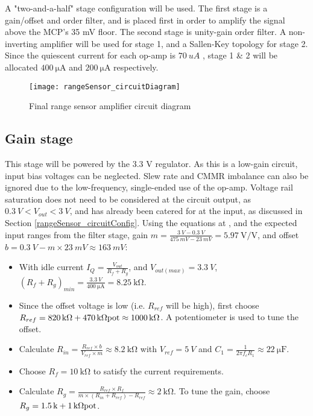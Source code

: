 A "two-and-a-half" stage configuration will be used. The first stage is a gain/offset and  order filter,
and is placed first in order to amplify the signal above the MCP's 35 mV floor. The second stage is unity-gain  order filter.
A non-inverting amplifier will be used for stage 1, and a Sallen-Key topology for stage 2. Since the quiescent current for each op-amp is
$\SI{70}{uA}$ \cite{datasheetMCP6242}, stage 1 \& 2 will be allocated $\SI{400}{\micro\ampere}$ and $\SI{200}{\micro\ampere}$ respectively.

\begin{figure}[!htb]
  \centering
  \texttt{[image: rangeSensor\_circuitDiagram]}
  \caption{Final range sensor amplifier circuit diagram}
  \label{fig:rangeSensor_circuitDiagram}
\end{figure}

\subsection{Gain stage}

This stage will be powered by the 3.3 V regulator. As this is a low-gain circuit, input bias voltages can be neglected.
Slew rate and CMMR imbalance can also be ignored due to the low-frequency, single-ended use of the op-amp.
Voltage rail saturation does not need to be considered at the circuit output, as $\SI{0.3}{V} < V_{out} < \SI{3}{V}$,
and has already been catered for at the input, as discussed in Section \ref{rangeSensor_circuitConfig}.
Using the equations at \cite{gainOffset30Seconds}, and the expected input ranges from the filter stage,
gain $m = \frac{\SI{3}{V} - \SI{0.3}{V}}{\SI{475}{mV} - \SI{23}{mV}} = \SI{5.97}{\volt\per\volt}$,
and offset $b = \SI{0.3}{V} - m \times \SI{23}{mV} \approx \SI{163}{mV}$:

\begin{itemize}
  \item With idle current $I_Q = \frac{V_{out}}{R_f + R_g}$, and $V_{out(max)} = \SI{3.3}{V}$, $(R_f + R_g)_{min} = \frac{\SI{3.3}{V}}{\SI{400}{\micro\ampere}} = \SI{8.25}{\kilo\ohm}$.
  \item Since the offset voltage is low (i.e. $R_{ref}$ will be high), first choose $R_{ref} = \SI{820}{\kilo\ohm} + \SI{470}{\kilo\ohm} \textnormal{pot} \approx \SI{1000}{\kilo\ohm}$.
        A potentiometer is used to tune the offset.
  \item Calculate $R_{in} = \frac{R_{ref} \times b}{V_{ref} \times m} \approx \SI{8.2}{\kilo\ohm}$ with $V_{ref} = \SI{5}{V}$ and $C_1 = \frac{1}{2 \pi f_c R_1} \approx \SI{22}{\micro\farad}$.
  \item Choose $R_f = \SI{10}{\kilo\ohm}$ to satisfy the current requirements.
  \item Calculate $R_g = \frac{R_{ref} \times R_f}{m \times (R_{in} + R_{ref}) - R_{ref}} \approx \SI{2}{\kilo\ohm}$. To tune the gain, choose $R_g = \SI{1.5}{k} + \SI{1}{\kilo\ohm}\textnormal{pot}$.
\end{itemize}


